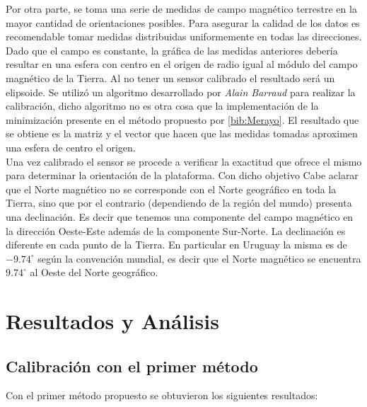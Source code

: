 \documentclass[spanish,12pt,a4paper,titlepage]{report}
\begin{document}
Por otra parte, se toma una serie de medidas de campo magnético terrestre en la mayor cantidad de  orientaciones posibles. Para asegurar la calidad de los datos es recomendable tomar medidas distribuidas uniformemente en todas las direcciones. Dado que el campo es constante, la gráfica de las medidas anteriores debería resultar en una esfera con centro en el origen de radio igual al módulo del campo magnético de la Tierra. Al no tener un sensor calibrado el resultado será un elipsoide. Se utilizó un algoritmo desarrollado por \emph{Alain Barraud} para realizar la calibración, dicho algoritmo no es otra cosa que la implementación de la minimización presente en el método propuesto por \ref{bib:Merayo}. El resultado que se obtiene es la matriz y el vector que hacen que las medidas tomadas aproximen una esfera de centro el origen.\\

Una vez calibrado el sensor se procede a verificar la exactitud que ofrece el mismo para determinar la orientación de la plataforma. Con dicho objetivo 
Cabe aclarar que el Norte magn\'etico no se corresponde con el Norte geogr\'afico en toda la Tierra, sino que por el contrario (dependiendo de la regi\'on del mundo) presenta una declinaci\'on. Es decir que tenemos una componente del campo magn\'etico en la dirección Oeste-Este adem\'as de la componente Sur-Norte. La declinaci\'on es diferente en cada punto de la 
Tierra. En particular en Uruguay la misma es de $-9.74^{\circ}$ seg\'un la convenci\'on mundial, es decir que el Norte magn\'etico se encuentra $9.74^{\circ}$ al Oeste del Norte geogr\'afico. 

\section{Resultados y Análisis}

\subsection{Calibración con el primer método}

Con el primer método propuesto se obtuvieron los siguientes resultados:
\end{document}
